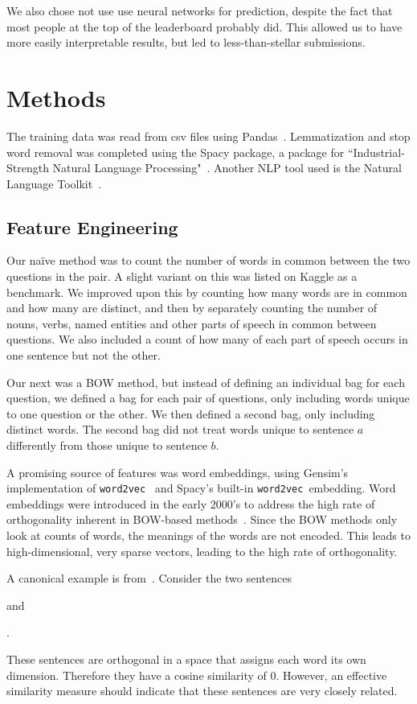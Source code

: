 \documentclass{article} %
\newcommand{\wordtvec}{\texttt{word2vec}}
\begin{document}
	We also chose not use use neural networks for prediction, despite the fact that most people at the top of the leaderboard probably did. This allowed us to have more easily interpretable results, but led to less-than-stellar submissions. 
	
	\section{Methods}
	
	The training data was read from csv files using Pandas~\cite{pandas}. Lemmatization and stop word removal was completed using the Spacy package, a package for ``Industrial-Strength Natural Language Processing"~\cite{spacy}. Another NLP tool used is the Natural Language Toolkit~\cite{nltk}.
	
	\subsection{Feature Engineering} \label{sub:features}
	
	Our na\"ive method was to count the number of words in common between the two questions in the pair. A slight variant on this was listed on Kaggle as a benchmark. We improved upon this by counting how many words are in common and how many are distinct, and then by separately counting the number of nouns, verbs, named entities and other parts of speech in common between questions. We also included a count of how many of each part of speech occurs in one sentence but not the other. 
	
	Our next was a BOW method, but instead of defining an individual bag for each question, we defined a bag for each pair of questions, only including words unique to one question or the other. We then defined a second bag, only including distinct words. The second bag did not treat words unique to sentence $a$ differently from those unique to sentence $b$.
	
	A promising source of features was word embeddings, using Gensim's implementation of \wordtvec~\cite{gensim} and Spacy's built-in \wordtvec\ embedding. Word embeddings were introduced in the early 2000's to address the high rate of orthogonality inherent in BOW-based methods~\cite{Bengio03}. Since the BOW methods only look at counts of words, the meanings of the words are not encoded. This leads to high-dimensional, very sparse vectors, leading to the high rate of orthogonality.
	
	A canonical example is from~\cite{kusner15}. Consider the two sentences
	\begin{center}
	\end{center}
	and 
	\begin{center}
		.
	\end{center}
	These sentences are orthogonal in a space that assigns each word its own dimension. Therefore they have a cosine similarity of 0. However, an effective similarity measure should indicate that these sentences are very closely related.
	
\end{document}
